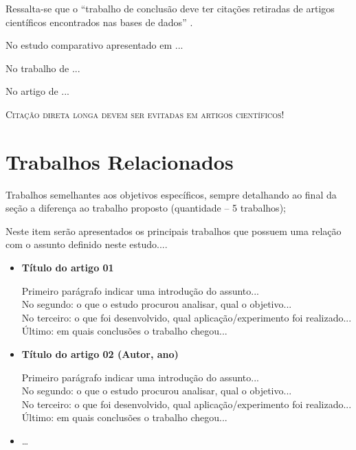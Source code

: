 \documentclass[12pt]{article}
\begin{document}
Ressalta-se que o \enquote{trabalho de conclusão deve ter citações retiradas de artigos científicos encontrados nas bases de dados} \cite{spinello2024}.

No estudo comparativo apresentado em \textcite[p. 107]{rabello2010} ...

No trabalho de \textcite{pargaonkar2021} ...

No artigo de \textcite{estevao2023} ...

\textsc{Citação direta longa devem ser evitadas em artigos científicos!}

\section{Trabalhos Relacionados}

Trabalhos semelhantes aos objetivos específicos, sempre detalhando ao final da seção a
diferença ao trabalho proposto (quantidade -- 5 trabalhos);

Neste item serão apresentados os principais trabalhos que possuem uma relação com o assunto definido neste estudo....

\begin{itemize}
     \item \textbf{Título do artigo 01 \cite{ogliari2019}}
     
     Primeiro parágrafo indicar uma introdução do assunto... \\
     No segundo: o que o estudo procurou analisar, qual o objetivo... \\
     No terceiro: o que foi desenvolvido, qual aplicação/experimento foi realizado... \\
     Último: em quais conclusões o trabalho chegou... \\
         
    \item \textbf{Título do artigo 02 (Autor, ano)}
    
     Primeiro parágrafo indicar uma introdução do assunto... \\
     No segundo: o que o estudo procurou analisar, qual o objetivo... \\
     No terceiro: o que foi desenvolvido, qual aplicação/experimento foi realizado... \\
     Último: em quais conclusões o trabalho chegou... \\
    
    \item \ldots
\end{itemize}
\end{document}
